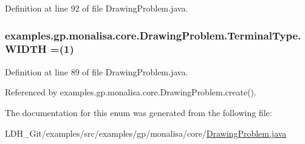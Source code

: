 Definition at line 92 of file Drawing\-Problem.\-java.

\hypertarget{enumexamples_1_1gp_1_1monalisa_1_1core_1_1_drawing_problem_1_1_terminal_type_aee7ab8fc9eca04d5afdeb41f4196c0b3}{
\subsubsection[{W\-I\-D\-T\-H}]{\setlength{\rightskip}{0pt plus 5cm}examples.\-gp.\-monalisa.\-core.\-Drawing\-Problem.\-Terminal\-Type.\-W\-I\-D\-T\-H =(1)}}\label{enumexamples_1_1gp_1_1monalisa_1_1core_1_1_drawing_problem_1_1_terminal_type_aee7ab8fc9eca04d5afdeb41f4196c0b3}


Definition at line 89 of file Drawing\-Problem.\-java.



Referenced by examples.\-gp.\-monalisa.\-core.\-Drawing\-Problem.\-create().



The documentation for this enum was generated from the following file\-:\begin{DoxyCompactItemize}
\item 
L\-D\-H\-\_\-\-Git/examples/src/examples/gp/monalisa/core/\hyperlink{_drawing_problem_8java}{Drawing\-Problem.\-java}\end{DoxyCompactItemize}
